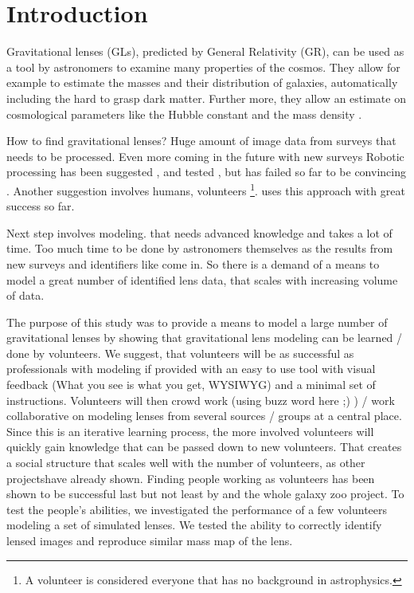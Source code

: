 \section{Introduction}
Gravitational lenses (GLs), predicted by General Relativity (GR), can be used as a tool by astronomers to examine many properties of the cosmos.
They allow for example to estimate the masses and their distribution of galaxies, automatically including the hard to grasp dark matter.
Further more, they allow an estimate on cosmological parameters like the Hubble constant \citep{Saha2006} and the mass density \needcite.


How to find gravitational lenses? Huge amount of image data from surveys that needs to be processed.
Even more coming in the future with new surveys \needcite
Robotic processing has been suggested \needcite, and tested \needcite, but has failed so far to be convincing \needcite.
Another suggestion involves humans, volunteers \footnote{A volunteer is considered everyone that has no background in astrophysics.}.
\sw uses this approach with great success so far.\needcite


Next step involves modeling. that needs advanced knowledge and takes a lot of time.
Too much time to be done by astronomers themselves as the results from new surveys and identifiers like \sw come in.
So there is a demand of a means to model a great number of identified lens data, that scales with increasing volume of data.


The purpose of this study was to provide a means to model a large number of gravitational lenses by showing that gravitational lens modeling can be learned / done by volunteers.
We suggest, that volunteers will be as successful as professionals with modeling if provided with an easy to use tool with visual feedback (What you see is what you get, WYSIWYG) and a minimal set of instructions.
Volunteers will then crowd work (using buzz word here ;) ) / work collaborative on modeling lenses from several sources / groups at a central place.
Since this is an iterative learning process, the more involved volunteers will quickly gain knowledge that can be passed down to new volunteers.
That creates a social structure that scales well with the number of volunteers, as other projects\needcite have already shown.
Finding people working as volunteers has been shown to be successful last but not least by \sw and the whole galaxy zoo project.
To test the people's abilities, we investigated the performance of a few volunteers modeling a set of simulated lenses.
We tested the ability to correctly identify lensed images and reproduce similar mass map of the lens.

